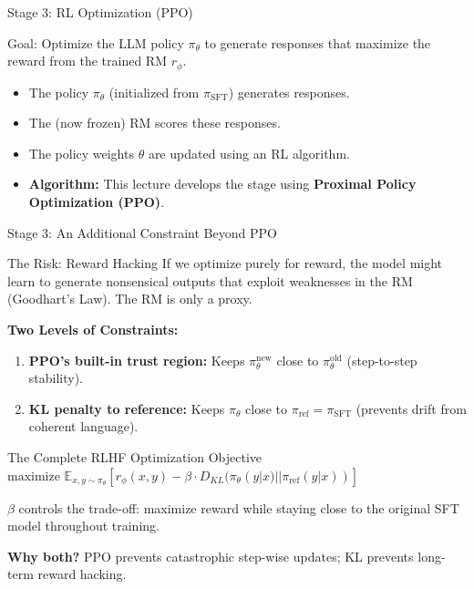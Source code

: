 \documentclass[xcolor=svgnames, 10pt, handout]{beamer}
\begin{document}
\begin{frame}{Stage 3: RL Optimization (PPO)}
    \begin{block}{Goal: Optimize the LLM policy $\pi_\theta$ to generate responses that maximize the reward from the trained RM $r_\phi$.}

    \pause

    \begin{itemize}
        \item The policy $\pi_\theta$ (initialized from $\pi_{\text{SFT}}$) generates responses.
        \pause
        \item The (now frozen) RM scores these responses.
        \pause
        \item The policy weights $\theta$ are updated using an RL algorithm.
        \pause
        \item \textbf{Algorithm:} This lecture develops the stage using \textbf{Proximal Policy Optimization (PPO)}.
    \end{itemize}
    \end{block}
\end{frame}

\begin{frame}{Stage 3: An Additional Constraint Beyond PPO}
    \begin{alertblock}{The Risk: Reward Hacking}
        If we optimize purely for reward, the model might learn to generate nonsensical outputs that exploit weaknesses in the RM (Goodhart's Law). The RM is only a proxy.
    \end{alertblock}
    \pause

    \textbf{Two Levels of Constraints:}
    \pause
    \begin{enumerate}
        \item \textbf{PPO's built-in trust region:} Keeps $\pi_{\theta}^{\text{new}}$ close to $\pi_{\theta}^{\text{old}}$ (step-to-step stability).
        \pause
        \item \textbf{KL penalty to reference:} Keeps $\pi_{\theta}$ close to $\pi_{\text{ref}} = \pi_{\text{SFT}}$ (prevents drift from coherent language).
    \end{enumerate}
    \pause

    \begin{block}{The Complete RLHF Optimization Objective}
    $ \text{maximize } \mathbb{E}_{x, y \sim \pi_\theta} \left[ r_\phi(x, y) - \beta \cdot D_{KL}(\pi_\theta(y|x) || \pi_{\text{ref}}(y|x)) \right] $
    \end{block}
    \pause

    $\beta$ controls the trade-off: maximize reward while staying close to the original SFT model throughout training.
    \pause

    \textbf{Why both?} PPO prevents catastrophic step-wise updates; KL prevents long-term reward hacking.
\end{frame}
\end{document}

